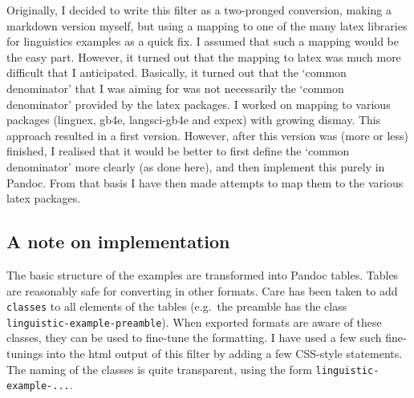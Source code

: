 \documentclass[
]{article}
\begin{document}
Originally, I decided to write this filter as a two-pronged conversion,
making a markdown version myself, but using a mapping to one of the many
latex libraries for linguistics examples as a quick fix. I assumed that
such a mapping would be the easy part. However, it turned out that the
mapping to latex was much more difficult that I anticipated. Basically,
it turned out that the `common denominator' that I was aiming for was
not necessarily the `common denominator' provided by the latex packages.
I worked on mapping to various packages (linguex, gb4e, langsci-gb4e and
expex) with growing dismay. This approach resulted in a first version.
However, after this version was (more or less) finished, I realised that
it would be better to first define the `common denominator' more clearly
(as done here), and then implement this purely in Pandoc. From that
basis I have then made attempts to map them to the various latex
packages.

\hypertarget{a-note-on-implementation}{%
\subsection{A note on implementation}\label{a-note-on-implementation}}

The basic structure of the examples are transformed into Pandoc tables.
Tables are reasonably safe for converting in other formats. Care has
been taken to add \texttt{classes} to all elements of the tables
(e.g.~the preamble has the class \texttt{linguistic-example-preamble}).
When exported formats are aware of these classes, they can be used to
fine-tune the formatting. I have used a few such fine-tunings into the
html output of this filter by adding a few CSS-style statements. The
naming of the classes is quite transparent, using the form
\texttt{linguistic-example-...}.
\end{document}
